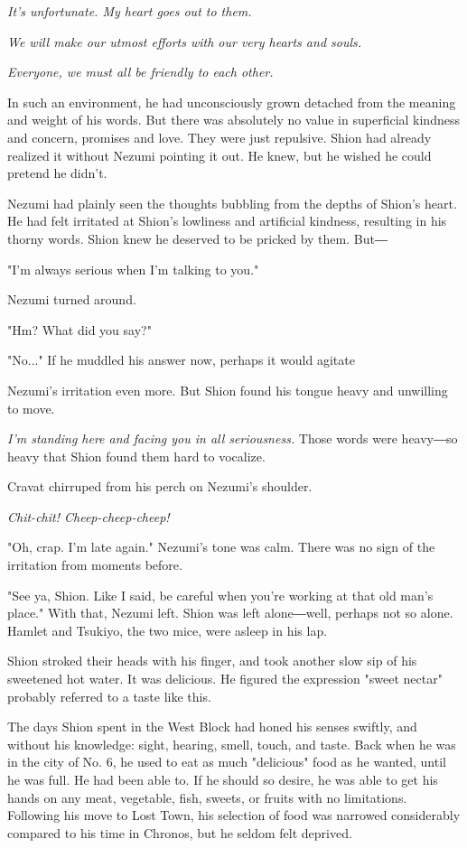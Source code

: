\emph{It's unfortunate. My heart goes out to them.}

\emph{We will make our utmost efforts with our very hearts and souls.}

\emph{Everyone, we must all be friendly to each other.}

In such an environment, he had unconsciously grown detached from the
meaning and weight of his words. But there was absolutely no value in
superficial kindness and concern, promises and love. They were just
repulsive. Shion had already realized it without Nezumi pointing it out.
He knew, but he wished he could pretend he didn't.

Nezumi had plainly seen the thoughts bubbling from the depths of Shion's
heart. He had felt irritated at Shion's lowliness and artificial
kindness, resulting in his thorny words. Shion knew he deserved to be
pricked by them. But―

"I'm always serious when I'm talking to you."

Nezumi turned around.

"Hm? What did you say?"

"No..." If he muddled his answer now, perhaps it would agitate~

Nezumi's irritation even more. But Shion found his tongue heavy and
unwilling to move.

\emph{I'm standing here and facing you in all seriousness.} Those words were
heavy―so heavy that Shion found them hard to vocalize.

Cravat chirruped from his perch on Nezumi's shoulder.

\emph{Chit-chit! Cheep-cheep-cheep!}

"Oh, crap. I'm late again." Nezumi's tone was calm. There was no sign of
the irritation from moments before.

"See ya, Shion. Like I said, be careful when you're working at that old
man's place." With that, Nezumi left. Shion was left alone―well, perhaps
not so alone. Hamlet and Tsukiyo, the two mice, were asleep in his lap.

Shion stroked their heads with his finger, and took another slow sip of
his sweetened hot water. It was delicious. He figured the expression
"sweet nectar" probably referred to a taste like this.

The days Shion spent in the West Block had honed his senses swiftly, and
without his knowledge: sight, hearing, smell, touch, and taste. Back
when he was in the city of No. 6, he used to eat as much "delicious"
food as he wanted, until he was full. He had been able to. If he should
so desire, he was able to get his hands on any meat, vegetable, fish,
sweets, or fruits with no limitations. Following his move to Lost Town,
his selection of food was narrowed considerably compared to his time in
Chronos, but he seldom felt deprived.

